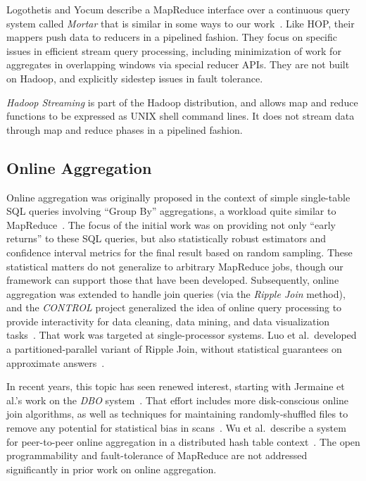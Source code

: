 Logothetis and Yocum describe a MapReduce interface over a continuous query
system called {\em Mortar} that is similar in some ways to our
work~\cite{logoyocum08}.  Like HOP, their mappers push data to reducers in a
pipelined fashion.  They focus on specific issues in efficient stream query
processing, including minimization of work for aggregates in overlapping
windows via special reducer APIs.  They are not built on Hadoop, and explicitly
sidestep issues in fault tolerance.

{\em Hadoop Streaming} is part of the Hadoop distribution, and allows map and
reduce functions to be expressed as UNIX shell command lines.  It does not
stream data through map and reduce phases in a pipelined fashion.

\subsection{Online Aggregation}

Online aggregation was originally proposed in the context of simple
single-table SQL queries involving ``Group By'' aggregations, a workload quite
similar to MapReduce~\cite{onlineagg}.  The focus of the initial work was on
providing not only ``early returns'' to these SQL queries, but also
statistically robust estimators and confidence interval metrics for the final
result based on random sampling.  These statistical matters do not generalize
to arbitrary MapReduce jobs, though our framework can support those that have
been developed.  Subsequently, online aggregation was extended to handle join
queries (via the {\em Ripple Join} method), and the {\em CONTROL} project
generalized the idea of online query processing to provide interactivity for
data cleaning, data mining, and data visualization tasks~\cite{ieeecontrol}.
That work was targeted at single-processor systems.  Luo et al.\ developed a
partitioned-parallel variant of Ripple Join, without statistical guarantees on
approximate answers~\cite{luo-ripple}.

In recent years, this topic has seen renewed interest, starting with Jermaine
et al.'s work on the {\em DBO} system~\cite{dbo}.  That effort includes more
disk-conscious online join algorithms, as well as techniques for maintaining
randomly-shuffled files to remove any potential for statistical bias in
scans~\cite{jermaine-shuffle}.  Wu et al.\ describe a system for peer-to-peer
online aggregation in a distributed hash table context~\cite{wu-vldb09}.  The
open programmability and fault-tolerance of MapReduce are not addressed
significantly in prior work on online aggregation.

